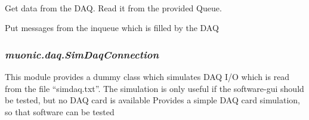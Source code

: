 \documentclass[letterpaper,10pt,english]{sphinxmanual}
\begin{document}
\begin{fulllineitems}
\label{muonic:muonic.daq.DaqConnection.DaqServer}~

\begin{fulllineitems}
\label{muonic:muonic.daq.DaqConnection.DaqServer.read}
Get data from the DAQ. Read it from the provided Queue.

\end{fulllineitems}


\begin{fulllineitems}
\label{muonic:muonic.daq.DaqConnection.DaqServer.serve}
\end{fulllineitems}


\begin{fulllineitems}
\label{muonic:muonic.daq.DaqConnection.DaqServer.setup_socket}
\end{fulllineitems}


\begin{fulllineitems}
\label{muonic:muonic.daq.DaqConnection.DaqServer.write}
Put messages from the inqueue which is filled by the DAQ

\end{fulllineitems}


\end{fulllineitems}



\subsubsection{\emph{muonic.daq.SimDaqConnection}}
\label{muonic:muonic-daq-simdaqconnection}
This module provides a dummy class which simulates DAQ I/O which is read from the file ``simdaq.txt''.
The simulation is only useful if the software-gui should be tested, but no DAQ card is available
\label{muonic:module-muonic.daq.SimDaqConnection}
Provides a simple DAQ card simulation, so that software can be tested
\end{document}
